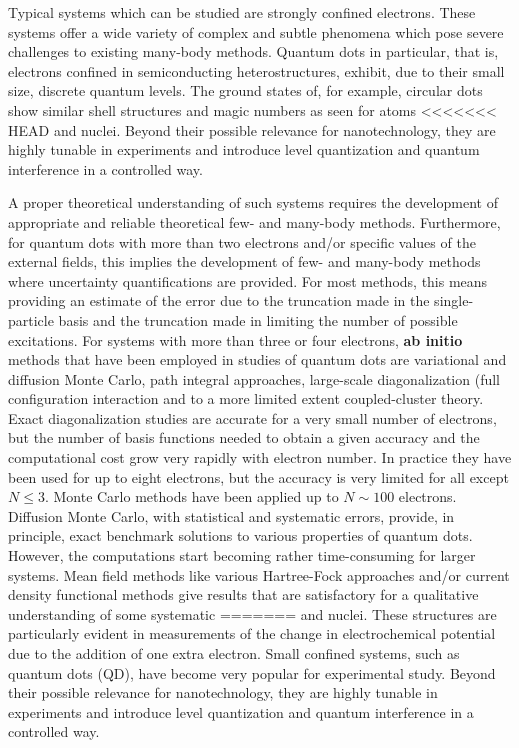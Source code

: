 \documentclass[%
oneside,                 %
final,                   %
10pt]{article}
\begin{document}
Typical systems which can be studied are strongly confined
electrons. These systems offer a wide variety of complex and subtle
phenomena which pose severe challenges to existing many-body methods.
Quantum dots in particular, that is, electrons confined in
semiconducting heterostructures, exhibit, due to their small size,
discrete quantum levels.  The ground states of, for example, circular
dots show similar shell structures and magic numbers as seen for atoms
<<<<<<< HEAD
and nuclei.
Beyond their possible relevance for
nanotechnology, they are highly tunable in experiments and introduce
level quantization and quantum interference in a controlled way. 

A proper theoretical understanding of such systems
requires the development of appropriate and reliable theoretical
few- and many-body methods.  Furthermore, for quantum dots with more
than two electrons and/or specific values of the external fields, this
implies the development of few- and many-body methods where
uncertainty quantifications are provided.  For most methods, this
means providing an estimate of the error due to the truncation made in
the single-particle basis and the truncation made in limiting the
number of possible excitations.  For systems with more than three or
four electrons, \textbf{ab initio} methods that have been employed in
studies of quantum dots are variational and diffusion Monte Carlo, path integral approaches, large-scale diagonalization (full configuration
interaction and to a more
limited extent coupled-cluster theory.
Exact diagonalization studies are accurate for a very small number of
electrons, but the number of basis functions needed to obtain a given
accuracy and the computational cost grow very rapidly with electron
number.  In practice they have been used for up to eight
electrons, but the accuracy is very
limited for all except $N\le 3$.  Monte Carlo methods have been
applied up to $N\sim 100$ electrons. Diffusion Monte Carlo, with
statistical and systematic errors, provide, in principle, exact
benchmark solutions to various properties of quantum dots. However,
the computations start becoming rather time-consuming for larger
systems.  Mean field methods like various Hartree-Fock approaches and/or 
current density functional
methods give results that are
satisfactory for a qualitative understanding of some systematic
=======
and nuclei. These structures are particularly evident in measurements
of the change in electrochemical potential due to the addition of one
extra electron.  Small confined systems, such as quantum dots (QD),
have become very popular for experimental study.  Beyond their
possible relevance for nanotechnology, they are highly tunable in
experiments and introduce level quantization and quantum interference
in a controlled way.
\end{document}
